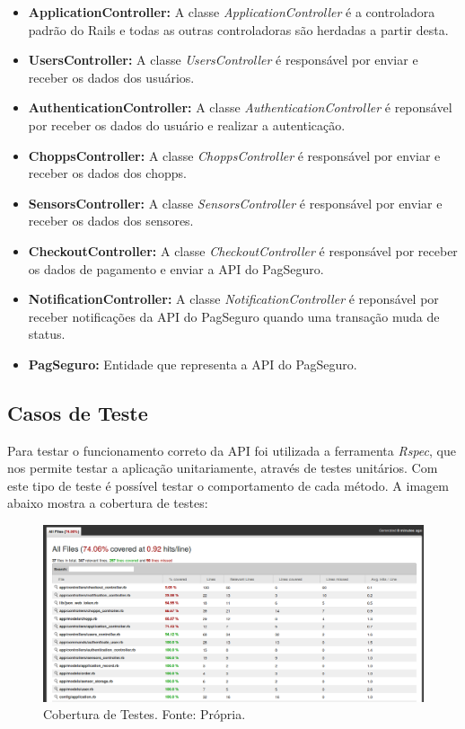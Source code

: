 \begin{itemize}
    \item \textbf{ApplicationController:} A classe \textit{ApplicationController} é a controladora padrão do Rails
    e todas as outras controladoras são herdadas a partir desta.
    \item \textbf{UsersController:} A classe \textit{UsersController} é responsável por enviar e receber os dados dos usuários.
    \item \textbf{AuthenticationController:} A classe \textit{AuthenticationController} é reponsável por receber os dados do usuário
    e realizar a autenticação.
    \item \textbf{ChoppsController:} A classe \textit{ChoppsController} é responsável por enviar e receber os dados dos chopps.
    \item \textbf{SensorsController:} A classe \textit{SensorsController} é responsável por enviar e receber os dados dos sensores.
    \item \textbf{CheckoutController:} A classe \textit{CheckoutController} é responsável por receber os dados de pagamento e enviar
    a API do PagSeguro.
    \item \textbf{NotificationController:} A classe \textit{NotificationController} é reponsável por receber notificações da API
    do PagSeguro quando uma transação muda de status.
    \item \textbf{PagSeguro:} Entidade que representa a API do PagSeguro.
\end{itemize}

\subsection{Casos de Teste}

Para testar o funcionamento correto da API foi utilizada a ferramenta \textit{Rspec}, que nos permite
testar a aplicação unitariamente, através de testes unitários. Com este tipo de teste é possível testar
o comportamento de cada método. A imagem abaixo mostra a cobertura de testes: 

\begin{figure}[H]
    \centering
    \includegraphics[scale= 0.3]{figuras/Cobertura.png}
    \caption{Cobertura de Testes. Fonte: Própria.}
    \label{modelagem}
\end{figure}


